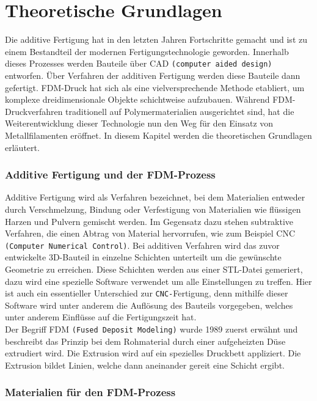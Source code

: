 \chapter{Theoretische Grundlagen}

Die additive Fertigung hat in den letzten Jahren Fortschritte gemacht und ist zu einem Bestandteil der modernen Fertigungstechnologie geworden. Innerhalb dieses Prozesses werden Bauteile über CAD \texttt{(computer aided design)} entworfen. Über Verfahren der additiven Fertigung werden diese Bauteile dann gefertigt. FDM-Druck hat sich als eine vielversprechende Methode etabliert, um komplexe dreidimensionale Objekte schichtweise aufzubauen. Während FDM-Druckverfahren traditionell auf Polymermaterialien ausgerichtet sind, hat die Weiterentwicklung dieser Technologie nun den Weg für den Einsatz von Metallfilamenten eröffnet. In diesem Kapitel werden die theoretischen Grundlagen erläutert.

\subsection{Additive Fertigung und der FDM-Prozess}

Additive Fertigung wird als Verfahren bezeichnet, bei dem Materialien entweder durch Verschmelzung, Bindung oder Verfestigung von Materialien wie flüssigen Harzen und Pulvern gemischt werden. Im Gegensatz dazu stehen subtraktive Verfahren, die einen Abtrag von Material hervorrufen, wie zum Beispiel CNC \texttt{(Computer Numerical Control)}. Bei additiven Verfahren wird das zuvor entwickelte 3D-Bauteil in einzelne Schichten unterteilt um die gewünschte Geometrie zu erreichen. Diese Schichten werden aus einer STL-Datei gemeriert, dazu wird eine spezielle Software verwendet um alle Einstellungen zu treffen. Hier ist auch ein essentieller Unterschied zur \texttt{CNC-}Fertigung, denn mithilfe dieser Software wird unter anderem die Auflösung des Bauteils vorgegeben, welches unter anderem Einflüsse auf die Fertigungszeit hat.\\
Der Begriff FDM  \texttt{(Fused Deposit Modeling)} wurde 1989 zuerst erwähnt und beschreibt das Prinzip bei dem Rohmaterial durch einer aufgeheizten Düse extrudiert wird. Die Extrusion wird auf ein spezielles Druckbett appliziert. Die Extrusion bildet Linien, welche dann aneinander gereit eine Schicht ergibt.

\autocite{Osama2019}

\subsection{Materialien für den FDM-Prozess}

